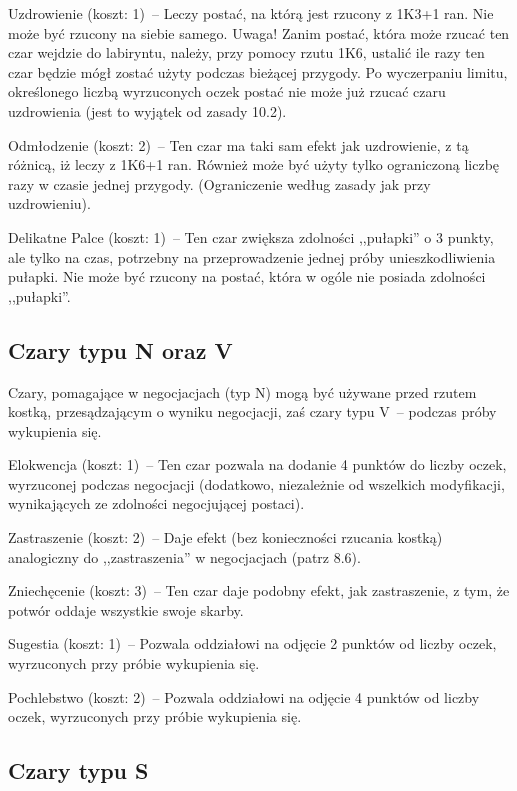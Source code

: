 Uzdrowienie (koszt: 1)~-- Leczy postać, na którą jest rzucony z 1K3+1 ran.
Nie może być rzucony na siebie samego.
Uwaga! Zanim postać, która może rzucać ten czar wejdzie do labiryntu, należy, przy pomocy rzutu 1K6, ustalić ile razy ten czar będzie mógł zostać użyty podczas bieżącej przygody.
Po wyczerpaniu limitu, określonego liczbą wyrzuconych oczek postać nie może już rzucać czaru uzdrowienia (jest to wyjątek od zasady 10.2).

Odmłodzenie (koszt: 2)~-- Ten czar ma taki sam efekt jak uzdrowienie, z tą różnicą, iż leczy z 1K6+1 ran.
Również może być użyty tylko ograniczoną liczbę razy w czasie jednej przygody. (Ograniczenie według zasady jak przy uzdrowieniu).

Delikatne Palce (koszt: 1)~-- Ten czar zwiększa zdolności ,,pułapki'' o 3 punkty, ale tylko na czas, potrzebny na przeprowadzenie jednej próby unieszkodliwienia pułapki.
Nie może być rzucony na postać, która w ogóle nie posiada zdolności ,,pułapki''.

\subsection{Czary typu N oraz V}

Czary, pomagające w negocjacjach (typ N) mogą być używane przed rzutem kostką, przesądzającym o wyniku negocjacji, zaś czary typu V~-- podczas próby wykupienia się.

Elokwencja (koszt: 1)~-- Ten czar pozwala na dodanie 4 punktów do liczby oczek, wyrzuconej podczas negocjacji (dodatkowo, niezależnie od wszelkich modyfikacji, wynikających ze zdolności negocjującej postaci).

Zastraszenie (koszt: 2)~-- Daje efekt (bez konieczności rzucania kostką) analogiczny do ,,zastraszenia'' w negocjacjach (patrz 8.6).

Zniechęcenie (koszt: 3)~-- Ten czar daje podobny efekt, jak zastraszenie, z tym, że potwór oddaje wszystkie swoje skarby.

Sugestia (koszt: 1)~-- Pozwala oddziałowi na odjęcie 2 punktów od liczby oczek, wyrzuconych przy próbie wykupienia się.

Pochlebstwo (koszt: 2)~-- Pozwala oddziałowi na odjęcie 4 punktów od liczby oczek, wyrzuconych przy próbie wykupienia się.

\subsection{Czary typu S}

